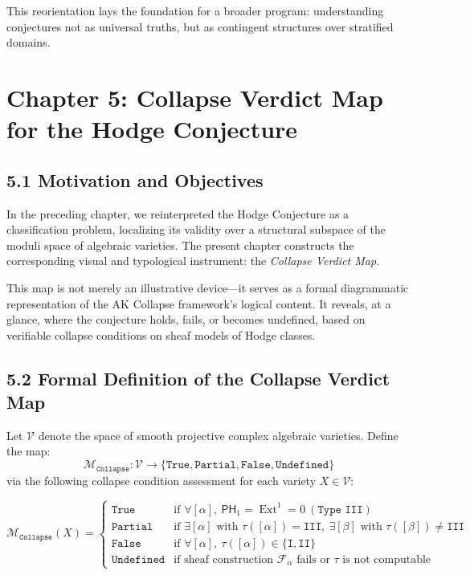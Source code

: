 \documentclass[11pt]{article}
\DeclareMathOperator{\Ext}{Ext}
\begin{document}
\bigskip

This reorientation lays the foundation for a broader program: understanding conjectures not as universal truths, but as contingent structures over stratified domains.




\section{Chapter 5: Collapse Verdict Map for the Hodge Conjecture}

\subsection{5.1 Motivation and Objectives}

In the preceding chapter, we reinterpreted the Hodge Conjecture as a classification problem, localizing its validity over a structural subspace of the moduli space of algebraic varieties. The present chapter constructs the corresponding visual and typological instrument: the \emph{Collapse Verdict Map}.

This map is not merely an illustrative device—it serves as a formal diagrammatic representation of the AK Collapse framework’s logical content. It reveals, at a glance, where the conjecture holds, fails, or becomes undefined, based on verifiable collapse conditions on sheaf models of Hodge classes.

\subsection{5.2 Formal Definition of the Collapse Verdict Map}

Let $\mathcal{V}$ denote the space of smooth projective complex algebraic varieties. Define the map:
\[
\mathcal{M}_{\texttt{Collapse}} : \mathcal{V} \to \{ \texttt{True}, \texttt{Partial}, \texttt{False}, \texttt{Undefined} \}
\]
via the following collapse condition assessment for each variety $X \in \mathcal{V}$:

\[
\mathcal{M}_{\texttt{Collapse}}(X) = 
\begin{cases}
\texttt{True} & \text{if } \forall [\alpha], \ \mathsf{PH}_1 = \Ext^1 = 0 \ (\texttt{Type III}) \\
\texttt{Partial} & \text{if } \exists [\alpha] \text{ with } \tau([\alpha]) = \texttt{III},\ \exists [\beta] \text{ with } \tau([\beta]) \ne \texttt{III} \\
\texttt{False} & \text{if } \forall [\alpha], \ \tau([\alpha]) \in \{ \texttt{I}, \texttt{II} \} \\
\texttt{Undefined} & \text{if sheaf construction $\mathcal{F}_\alpha$ fails or $\tau$ is not computable}
\end{cases}
\]
\end{document}
